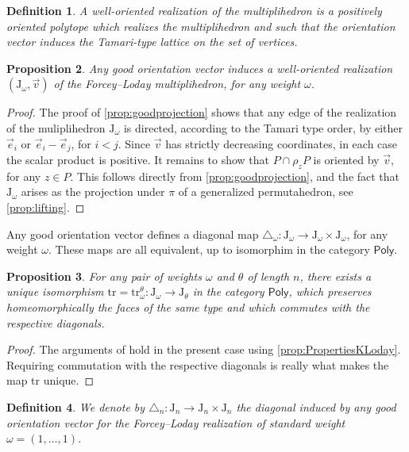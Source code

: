 \documentclass[twoside, 12pt]{amsart}
\newtheorem{definition}{Definition}[section]
\newtheorem{proposition}[definition]{Proposition}
\theoremstyle{remark}
\newcommand{\J}{\mathrm{J}}
\newcommand{\PolySub}{\mathsf{Poly}}
\newcommand{\tr}{\mathrm{tr}}
\begin{document}
\begin{definition}
A \emph{well-oriented realization of the multiplihedron} is a positively oriented polytope which realizes the multiplihedron and such that the orientation vector induces the Tamari-type lattice on the set of vertices. 
\end{definition}

\begin{proposition}
\label{prop:OrientationVector}
Any good orientation vector induces a well-oriented realization $(\J_\omega, \vec v)$ of the Forcey--Loday multiplihedron, for any weight $\omega$. 
\end{proposition}

\begin{proof}
The proof of \cref{prop:goodprojection} shows that any edge of the realization of the muliplihedron $\J_\omega$ is directed, according to the Tamari type order, by either $\vec e_i$ or $\vec e_i-\vec e_j$, for $i<j$. 
Since $\vec v$ has strictly decreasing coordinates, in each case the scalar product is positive. 
It remains to show that $P\cap\rho_z P$ is oriented by $\vec v$, for any $z \in P$. 
This follows directly from \cref{prop:goodprojection}, and the fact that $\J_\omega$ arises as the projection under $\pi$ of a generalized permutahedron, see \cref{prop:lifting}.
\end{proof}

Any good orientation vector defines a diagonal map $\triangle_\omega : \J_\omega\to \J_\omega \times \J_\omega$, for any weight $\omega$.
These maps are all equivalent, up to isomorphim in the category $\PolySub$. 

\begin{proposition}
\label{prop:transitionmap}
For any pair of weights $\omega$ and $\theta$ of length $n$, there exists a unique isomorphism 
$\tr=\tr_\omega^\theta : \J_\omega \to \J_\theta$ in the category $\PolySub$,  
which preserves homeomorphically the faces of the same type and which commutes with the respective diagonals.
\end{proposition}

\begin{proof}
The arguments of \cite[Sections~3.1-3.2]{MTTV19} hold in the present case using \cref{prop:PropertiesKLoday}. 
Requiring commutation with the respective diagonals is really what makes the map $\tr$ unique.
\end{proof}

\begin{definition}
We denote by $\triangle_n : \J_n \to \J_n\times \J_n$ the diagonal induced by any good orientation vector for the Forcey--Loday realization of standard weight $\omega=(1, \ldots, 1)$.
\end{definition}
\end{document}
